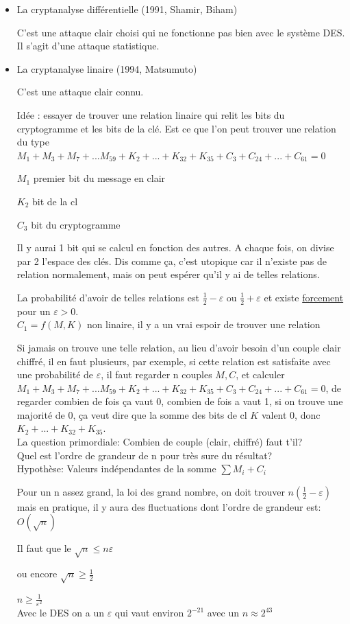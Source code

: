 \documentclass[12pt,a4paper]{article}
\begin{document}
\begin{itemize}
\item La cryptanalyse différentielle (1991, Shamir, Biham)

C'est une attaque  clair choisi qui ne fonctionne pas bien avec le système DES. Il s'agit d'une attaque statistique.\\

\item La cryptanalyse linaire (1994, Matsumuto)

C'est une attaque  clair connu.

Idée : essayer de trouver une relation linaire qui relit les bits du cryptogramme et les bits de la clé. Est ce que l'on peut trouver une relation du type $M_1+M_3+M_7+...M_{59}+K_2+...+K_{32}+K_{35}+C_3+C_{24}+...+C_{61}=0$

$M_1$ premier bit du message en clair

$K_2$ bit de la cl

$C_3$ bit du cryptogramme

Il y aurai 1 bit qui se calcul en fonction des autres. A chaque fois, on divise par 2 l'espace des clés. Dis comme ça, c'est utopique car il n'existe pas de relation normalement, mais on peut espérer qu'il y ai de telles relations.

La probabilité d'avoir de telles relations est $\frac{1}{2}-\varepsilon$ ou $\frac{1}{2}+\varepsilon$ et existe \underline{forcement} pour un $\varepsilon > 0$.\\

$C_1=f(M,K)$ non linaire, il y a un vrai espoir de trouver une relation

Si jamais on trouve une telle relation, au lieu d'avoir besoin d'un couple clair chiffré, il en faut plusieurs, par exemple, si cette relation est satisfaite avec une probabilité de $\varepsilon$, il faut regarder n couples $M,C$, et calculer $M_1+M_3+M_7+...M_{59}+K_2+...+K_{32}+K_{35}+C_3+C_{24}+...+C_{61}=0$, de regarder combien de fois ça vaut 0, combien de fois a vaut 1, si on trouve une majorité de 0, ça veut dire que la somme des bits de cl $K$ valent 0, donc $K_2+...+K_{32}+K_{35}$.\\

La question primordiale: Combien de couple (clair, chiffré) faut t'il?\\

Quel est l'ordre de grandeur de n pour très sure du résultat?\\

Hypothèse: Valeurs indépendantes de la somme $\sum M_i + C_i$

Pour un n assez grand, la loi des grand nombre, on doit trouver $n(\frac{1}{2} - \varepsilon)$ mais en pratique, il y aura des fluctuations dont l'ordre de grandeur est: $O(\sqrt{n})$

Il faut que le $\sqrt{n} \leq n \varepsilon$

ou encore $\sqrt{n} \geq \frac{1}{2}$

$n \geq \frac{1}{\varepsilon^2}$\\

Avec le DES on a un $\varepsilon$ qui vaut environ $2^{-21}$ avec un $n \approx 2^{43}$
\end{itemize}
\end{document}
